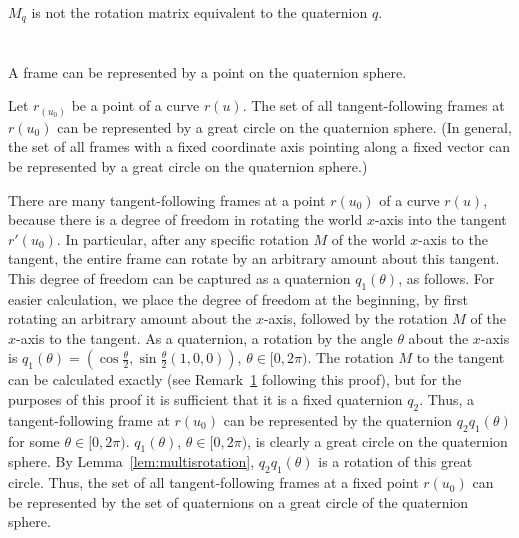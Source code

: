 \begin{rmk}
$M_q$ is not the rotation matrix equivalent to the quaternion $q$.
\end{rmk}

\section{}

A frame can be represented by a point on the quaternion sphere.

\begin{theorem}
Let $r_(u_0)$ be a point of a curve $r(u)$.
The set of all tangent-following frames at $r(u_0)$
can be represented by a great circle on the quaternion sphere.
(In general, the set of all frames with a fixed coordinate axis pointing
along a fixed vector can be represented by a great circle on the quaternion sphere.)
\end{theorem}
\prf
There are many tangent-following frames at a point $r(u_0)$ of a curve $r(u)$,
because there is a degree of freedom in rotating the world $x$-axis
into the tangent $r'(u_0)$.
In particular, after any specific rotation $M$ of the world $x$-axis
to the tangent, the entire frame can rotate by an arbitrary amount
about this tangent.
This degree of freedom can be captured as a quaternion $q_1(\theta)$,
as follows.
For easier calculation, we place the degree of freedom at the beginning,
by first rotating an arbitrary amount about the $x$-axis,
followed by the rotation $M$ of the $x$-axis to the tangent.
As a quaternion, a rotation by the angle $\theta$ about the $x$-axis 
is $q_1(\theta) = (\cos \frac{\theta}{2}, \sin \frac{\theta}{2} (1,0,0))$,
$\theta \in [0,2\pi)$.
The rotation $M$ to the tangent can be calculated exactly (see Remark~\ref{}
following this proof), but for the purposes of this proof it is sufficient
that it is a fixed quaternion $q_2$.
Thus, a tangent-following frame at $r(u_0)$ can be represented
by the quaternion $q_2 q_1(\theta)$ for some $\theta \in [0,2\pi)$.
$q_1(\theta)$, $\theta \in [0,2\pi)$, is clearly a great circle
on the quaternion sphere.
By Lemma~\ref{lem:multisrotation}, 
$q_2 q_1(\theta)$ is a rotation of this great circle.
Thus, the set of all tangent-following frames at a fixed point $r(u_0)$
can be represented by the set of quaternions on a great circle
of the quaternion sphere.
\QED

